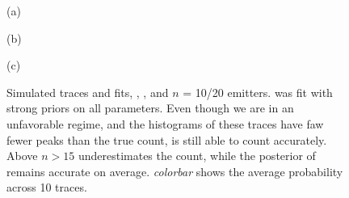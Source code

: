 \begin{figure}

  \begin{panel}{(a)}{\textwidth}
    \hspace{-2mm}%
    \setlength\plotwidth{\textwidth}%
    \setlength\plotheight{36mm}%
    
    \vspace{-4mm}
  \end{panel}

  \begin{panel}{(b)}{\textwidth}
    \hspace{-2mm}%
    \setlength\plotwidth{\textwidth}%
    \setlength\plotheight{36mm}%
    
    \vspace{-4mm}
  \end{panel}

  \begin{panel}{(c)}{\textwidth}
    \setlength\plotwidth{72mm}%
    \setlength\plotheight{72mm}%
    \centering%
    
  \end{panel}

  \caption{
     Simulated traces and \ours fits, , ,  and  $n$ = 10/20 emitters. 
    \ours was fit with strong priors on all parameters. Even though we are in an unfavorable regime, and 
    the histograms of these traces have faw fewer peaks than the true count, \ours is still able to count accurately.
     Above $n > 15$ \qpaint underestimates the count, while 
    the posterior of \ours remains accurate on average. \textit{colorbar} shows the 
    average probability across 10 traces.
  }
  \label{fig:results:qpaint_counting}
\end{figure}

